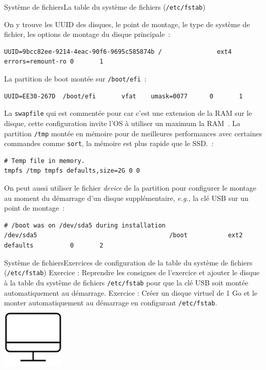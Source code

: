 \documentclass{beamer}
\begin{document}
    \begin{frame}[fragile]{Système de fichiers}{La table du système de fichiers (\lstinline{/etc/fstab})}
        \begin{small}
            On y trouve les UUID des disques, le point de montage, le type de système de fichier, les options de montage du disque principale~:
            \begin{lstlisting}[basicstyle=\tiny\ttfamily]
UUID=9bcc82ee-9214-4eac-90f6-9695c585874b /               ext4    errors=remount-ro 0       1
            \end{lstlisting}
            La partition de boot montée sur \lstinline{/boot/efi}~:
            \begin{lstlisting}[basicstyle=\tiny\ttfamily]
UUID=EE30-267D  /boot/efi       vfat    umask=0077      0       1
            \end{lstlisting}
            La \lstinline{swapfile} qui est commentée pour car c'est une extension de la RAM sur le disque, cette configuration invite l'OS à utiliser un maximum la RAM~.
            La partition \lstinline{/tmp} montée en mémoire pour de meilleures performances avec certaines commandes comme \lstinline{sort}, la mémoire est plus rapide que le SSD.~:
            \begin{lstlisting}[basicstyle=\tiny\ttfamily]
# Temp file in memory.
tmpfs /tmp tmpfs defaults,size=2G 0 0
            \end{lstlisting}
            On peut aussi utiliser le fichier \textit{device} de la partition pour configurer le montage au moment du démarrage d'un disque supplémentaire, \textit{e.g.}, la clé USB sur un point de montage~:
            \begin{lstlisting}[basicstyle=\tiny\ttfamily]
# /boot was on /dev/sda5 during installation
/dev/sda5                                    /boot           ext2    defaults          0       2
            \end{lstlisting}
        \end{small}
    \end{frame}

    \begin{frame}{Système de fichiers}{Exercices de configuration de la table du système de fichiers (\lstinline{/etc/fstab})}
        Exercice \execcounterdispinc: Reprendre les consignes de l'exercice  \theexemountcounter{} et ajouter le disque à la table du système de fichiers \lstinline{/etc/fstab} pour que la clé USB soit montée automatiquement au démarrage.
        \bigbreak
        Exercice \execcounterdispinc: Créer un disque virtuel de 1 Go et le monter automatiquement au démarrage en configurant \lstinline{/etc/fstab}.
        \bigbreak
        \centering
        \includegraphics[width=3cm]{image/desktop}
    \end{frame}
\end{document}
